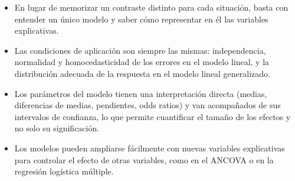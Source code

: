 \documentclass[
  spanish,
  a4paper,
]{scrreport}
\providecommand{\tightlist}{%
  \setlength{\itemsep}{0pt}\setlength{\parskip}{0pt}}
\theoremstyle{plain}
\theoremstyle{definition}
\theoremstyle{definition}
\theoremstyle{remark}
\begin{document}
\begin{itemize}
\tightlist
\item
  En lugar de memorizar un contraste distinto para cada situación, basta
  con entender un único modelo y saber cómo representar en él las
  variables explicativas.
\item
  Las condiciones de aplicación son siempre las mismas: independencia,
  normalidad y homocedasticidad de los errores en el modelo lineal, y la
  distribución adecuada de la respuesta en el modelo lineal
  generalizado.
\item
  Los parámetros del modelo tienen una interpretación directa (medias,
  diferencias de medias, pendientes, odds ratios) y van acompañados de
  sus intervalos de confianza, lo que permite cuantificar el tamaño de
  los efectos y no solo su significación.
\item
  Los modelos pueden ampliarse fácilmente con nuevas variables
  explicativas para controlar el efecto de otras variables, como en el
  ANCOVA o en la regresión logística múltiple.
\end{itemize}
\end{document}
